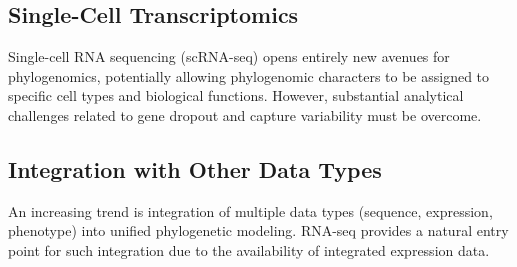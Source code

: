 \subsection{Single-Cell Transcriptomics}

Single-cell RNA sequencing (scRNA-seq) opens entirely new avenues for phylogenomics, potentially allowing phylogenomic characters to be assigned to specific cell types and biological functions. However, substantial analytical challenges related to gene dropout and capture variability must be overcome.

\subsection{Integration with Other Data Types}

An increasing trend is integration of multiple data types (sequence, expression, phenotype) into unified phylogenetic modeling. RNA-seq provides a natural entry point for such integration due to the availability of integrated expression data.

